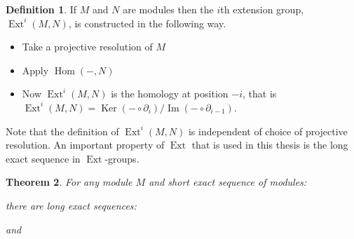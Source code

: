 \documentclass[11pt, a4paper, english]{article}
\newtheorem{theorem}{Theorem}[section]
\theoremstyle{definition}
\newtheorem{defin}[theorem]{Definition}
\DeclareMathOperator{\Hom}{Hom}
\DeclareMathOperator{\Ext}{Ext}
\DeclareMathOperator{\Image}{Im}
\DeclareMathOperator{\Ker}{Ker}
\begin{document}
\begin{appendices}
\begin{defin}
\label{def:Ext}
If $M$ and $N$ are modules then the $i$th extension group, $\Ext^i(M, N)$, is constructed in the following way.
\begin{itemize}
\item Take a projective resolution of $M$
\begin{center}
\end{center}
\item Apply $\Hom(-,N)$
\begin{center}
\end{center}
\item Now $\Ext^i(M, N)$ is the homology at position $-i$, that is $\Ext^i(M,N) = \Ker (- \circ \partial_{i}) / \Image (- \circ \partial_{i-1})$.
\end{itemize}
\end{defin}

Note that the definition of $\Ext^i(M, N)$ is independent of choice of projective resolution. An important property of $\Ext$ that is used in this thesis is the long exact sequence in $\Ext$-groups.

\begin{theorem}
\label{thm:LES_ext}
For any module $M$ and short exact sequence of modules:
\begin{center}
\end{center}
there are long exact sequences:
\begin{center}
\end{center}
and
\begin{center}
\end{center}
\end{theorem}

\end{appendices}
\end{document}
